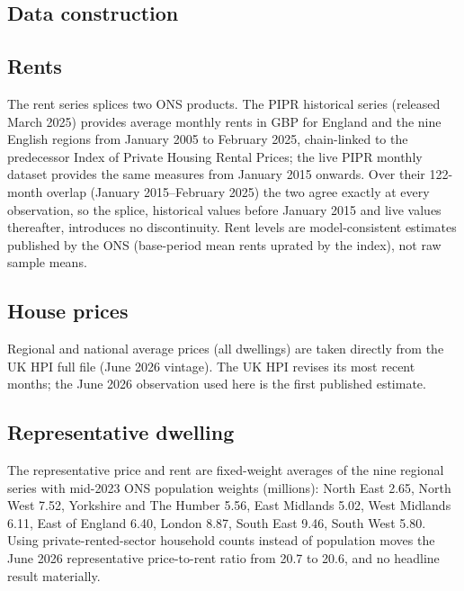 
\begin{appendices}

\section{Data construction}
\label{app:data}

\subsection*{Rents}

The rent series splices two ONS products. The PIPR historical series (released March 2025) provides average monthly rents in GBP for England and the nine English regions from January 2005 to February 2025, chain-linked to the predecessor Index of Private Housing Rental Prices; the live PIPR monthly dataset provides the same measures from January 2015 onwards. Over their 122-month overlap (January 2015--February 2025) the two agree exactly at every observation, so the splice, historical values before January 2015 and live values thereafter, introduces no discontinuity. Rent levels are model-consistent estimates published by the ONS (base-period mean rents uprated by the index), not raw sample means.

\subsection*{House prices}

Regional and national average prices (all dwellings) are taken directly from the UK HPI full file (June 2026 vintage). The UK HPI revises its most recent months; the June 2026 observation used here is the first published estimate.

\subsection*{Representative dwelling}

The representative price and rent are fixed-weight averages of the nine regional series with mid-2023 ONS population weights (millions): North East 2.65, North West 7.52, Yorkshire and The Humber 5.56, East Midlands 5.02, West Midlands 6.11, East of England 6.40, London 8.87, South East 9.46, South West 5.80. Using private-rented-sector household counts instead of population moves the June 2026 representative price-to-rent ratio from 20.7 to 20.6, and no headline result materially.


\end{appendices}
